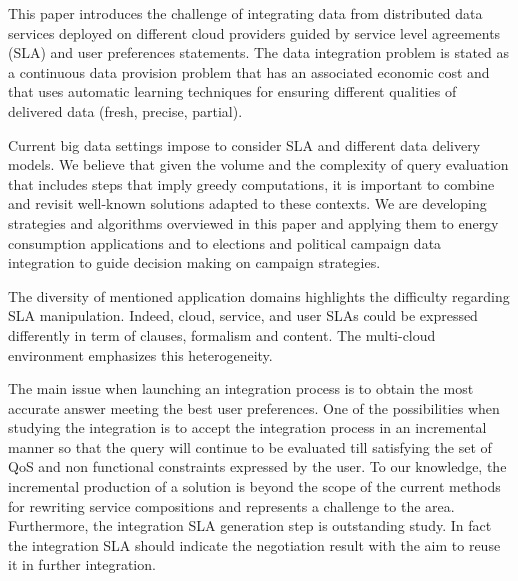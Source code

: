 This paper introduces the challenge of integrating data from distributed data services deployed on different cloud providers guided by service level agreements (SLA) and user preferences statements. The data integration problem is stated as a continuous data provision problem that has an associated economic cost and that uses automatic learning techniques for ensuring different qualities of delivered data (fresh, precise, partial).



Current big data settings impose  to consider SLA and different data delivery models. We believe that given the volume and the complexity of query evaluation that includes steps that imply greedy computations, it is important to combine and revisit well-known solutions  adapted to these contexts. We are  developing  strategies and algorithms overviewed in this paper and applying them to energy consumption applications and to elections and political campaign data integration to guide decision making on campaign strategies.

The diversity of mentioned application domains highlights the difficulty regarding SLA manipulation. Indeed, cloud, service, and user SLAs could be expressed differently in term of clauses, formalism and content. The multi-cloud environment emphasizes this heterogeneity. 

 
The main issue when launching an integration process is to obtain the most accurate answer meeting the best user preferences. One of the possibilities when studying the integration is to accept the integration process in an incremental  manner so that the query will continue to be evaluated till satisfying the set of QoS and non functional constraints expressed by the user. To our knowledge, the incremental production of a solution is beyond  the scope of the current methods for rewriting service compositions and represents a challenge to the area.
Furthermore, the integration SLA generation step is outstanding study. In fact the integration SLA should indicate the negotiation result with the aim to reuse it in further integration.


% 
%
%
%

